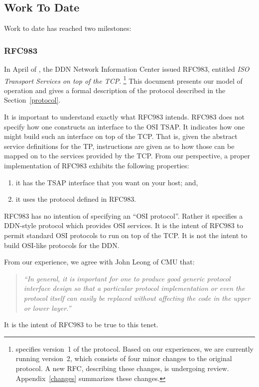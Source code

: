 \subsection	{Work To Date}
Work to date has reached two milestones:

\subsubsection	{RFC983}
In April of {},
the DDN Network Information Center issued RFC983,
entitled {\it ISO Transport Services on top of the TCP\/}\cite{TSAP.on.TCP.old}.%
\footnote{\cite{TSAP.on.TCP.old} specifies version~1 of the protocol.
Based on our experiences,
we are currently running version~2,
which consists of four minor changes to the original protocol.
A new RFC, describing these changes, is undergoing review.
Appendix~\ref{changes} summarizes these changes.}
This document presents our model of operation and gives a formal description
of the protocol described in the Section~\ref{protocol}.

It is important to understand exactly what RFC983 intends.
RFC983 does not specify how one constructs an interface to the OSI TSAP.
It indicates how one might build such an interface on top of the TCP.
That is,
given the abstract service definitions for the TP,
instructions are given as to how those can be mapped on to the services
provided by the TCP.
From our perspective, a proper implementation of RFC983 exhibits the
following properties:  
\begin{enumerate}
\item	it has the TSAP interface that you want on your host;
	and,
\item	it uses the protocol defined in RFC983.
\end{enumerate}
RFC983 has no intention of specifying an ``OSI protocol''.
Rather it specifies a DDN-style protocol which provides OSI services.
It is the intent of RFC983 to permit standard OSI protocols to run on top of
the TCP.
It is not the intent to build OSI-like protocols for the DDN.  

From our experience, we agree with John Leong of CMU that:
\begin{quote}\em
``In general,
it is important for one to produce good generic protocol interface design so
that a particular protocol implementation or even the protocol itself can
easily be replaced without affecting the code in the upper or lower layer.''
\end{quote}
It is the intent of RFC983 to be true to this tenet.

